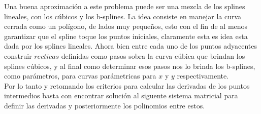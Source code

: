 Una buena aproximaci\'on a este problema puede ser una
mezcla de los splines lineales, con los c\'ubicos y los b-splines.
La idea consiste en manejar la curva cerrada como un pol\'igono, de lados
muy peque\~nos, esto con el fin de al menos garantizar que el spline
toque los puntos iniciales, claramente esta es idea esta dada por los
splines lineales. Ahora bien entre cada uno de los puntos
adyacentes construir $recticas$ definidas como pasos sobra la
curva c\'ubica que brindan los splines c\'ubicos, y al final como determinar
esos pasos nos lo brinda los b-splines, como par\'ametros,
para curvas par\'ametricas para $x$ y $y$ respectivamente.\\
Por lo tanto y retomando los criterios para calcular las derivadas de los
puntos intermedios basta con encontrar soluci\'on al siguente sistema matricial
para definir las derivadas y posteriormente los polinomios entre estos.\\

